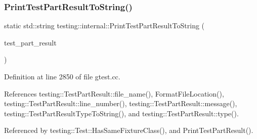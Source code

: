 \mbox{\label{namespacetesting_1_1internal_ada13cbf91139f0809a5a31ea2594c1ad}} 
\subsubsection{\texorpdfstring{Print\+Test\+Part\+Result\+To\+String()}{PrintTestPartResultToString()}}
{\footnotesize\ttfamily static std\+::string testing\+::internal\+::\+Print\+Test\+Part\+Result\+To\+String (\begin{DoxyParamCaption}\item[{const \hyperlink{classtesting_1_1TestPartResult}{Test\+Part\+Result} \&}]{test\+\_\+part\+\_\+result }\end{DoxyParamCaption})\hspace{0.3cm}{\ttfamily [static]}}



Definition at line 2850 of file gtest.\+cc.



References testing\+::\+Test\+Part\+Result\+::file\+\_\+name(), Format\+File\+Location(), testing\+::\+Test\+Part\+Result\+::line\+\_\+number(), testing\+::\+Test\+Part\+Result\+::message(), testing\+::\+Test\+Part\+Result\+Type\+To\+String(), and testing\+::\+Test\+Part\+Result\+::type().



Referenced by testing\+::\+Test\+::\+Has\+Same\+Fixture\+Class(), and Print\+Test\+Part\+Result().


